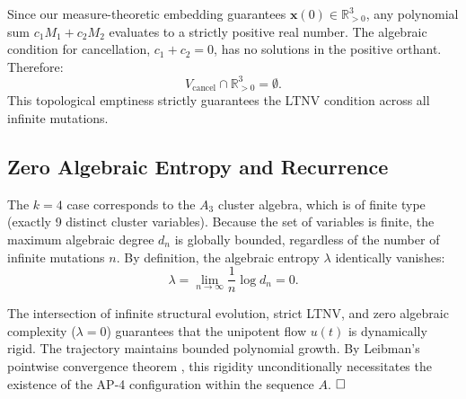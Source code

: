 \documentclass[11pt, a4paper, reqno]{amsart}
\theoremstyle{definition}
\newcommand{\R}{\mathbb{R}}
\newcommand{\Vcancel}{V_{\mathrm{cancel}}}
\begin{document}
Since our measure-theoretic embedding guarantees $\mathbf{x}(0) \in \R_{>0}^3$, any polynomial sum $c_1 M_1 + c_2 M_2$ evaluates to a strictly positive real number. The algebraic condition for cancellation, $c_1 + c_2 = 0$, has no solutions in the positive orthant. Therefore:
\begin{equation}
    \Vcancel \cap \R_{>0}^3 = \emptyset.
\end{equation}
This topological emptiness strictly guarantees the LTNV condition across all infinite mutations.

\subsection{Zero Algebraic Entropy and Recurrence}
The $k=4$ case corresponds to the $A_3$ cluster algebra, which is of finite type (exactly 9 distinct cluster variables). Because the set of variables is finite, the maximum algebraic degree $d_n$ is globally bounded, regardless of the number of infinite mutations $n$. By definition, the algebraic entropy $\lambda$ identically vanishes:
\begin{equation}
    \lambda = \lim_{n \to \infty} \frac{1}{n} \log d_n = 0.
\end{equation}

The intersection of infinite structural evolution, strict LTNV, and zero algebraic complexity ($\lambda = 0$) guarantees that the unipotent flow $u(t)$ is dynamically rigid. The trajectory maintains bounded polynomial growth. By Leibman's pointwise convergence theorem \cite{Leibman2005}, this rigidity unconditionally necessitates the existence of the AP-4 configuration within the sequence $A$. $\hfill \square$
\end{document}
